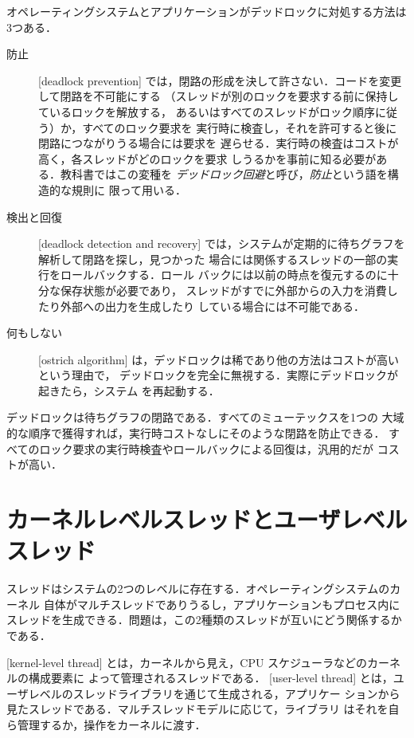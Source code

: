 \documentclass[../main.tex]{subfiles}
\begin{document}
オペレーティングシステムとアプリケーションがデッドロックに対処する方法は
3つある．
\begin{description}
  \item[防止] [deadlock prevention]%
    では，閉路の形成を決して許さない．コードを変更して閉路を不可能にする
    （スレッドが別のロックを要求する前に保持しているロックを解放する，
    あるいはすべてのスレッドがロック順序に従う）か，すべてのロック要求を
    実行時に検査し，それを許可すると後に閉路につながりうる場合には要求を
    遅らせる．実行時の検査はコストが高く，各スレッドがどのロックを要求
    しうるかを事前に知る必要がある．教科書ではこの変種を
    \emph{デッドロック回避}と呼び，\emph{防止}という語を構造的な規則に
    限って用いる．
  \item[検出と回復]
    [deadlock detection and recovery]%
    では，システムが定期的に待ちグラフを解析して閉路を探し，見つかった
    場合には関係するスレッドの一部の実行をロールバックする．ロール
    バックには以前の時点を復元するのに十分な保存状態が必要であり，
    スレッドがすでに外部からの入力を消費したり外部への出力を生成したり
    している場合には不可能である．
  \item[何もしない] [ostrich algorithm]%
    は，デッドロックは稀であり他の方法はコストが高いという理由で，
    デッドロックを完全に無視する．実際にデッドロックが起きたら，システム
    を再起動する．
\end{description}

\begin{keypoint}
  デッドロックは待ちグラフの閉路である．すべてのミューテックスを1つの
  大域的な順序で獲得すれば，実行時コストなしにそのような閉路を防止できる．
  すべてのロック要求の実行時検査やロールバックによる回復は，汎用的だが
  コストが高い．
\end{keypoint}

\section{カーネルレベルスレッドとユーザレベルスレッド}
\label{sec:l03-klt-ult}

スレッドはシステムの2つのレベルに存在する．オペレーティングシステムのカーネル
自体がマルチスレッドでありうるし，アプリケーションもプロセス内に
スレッドを生成できる．問題は，この2種類のスレッドが互いにどう関係するか
である．
\begin{definition}[カーネルレベルスレッドとユーザレベルスレッド]
  [kernel-level thread]%
  とは，カーネルから見え，CPU スケジューラなどのカーネルの構成要素に
  よって管理されるスレッドである．
  [user-level thread]%
  とは，ユーザレベルのスレッドライブラリを通じて生成される，アプリケー
  ションから見たスレッドである．マルチスレッドモデルに応じて，ライブラリ
  はそれを自ら管理するか，操作をカーネルに渡す．
\end{definition}
\end{document}
